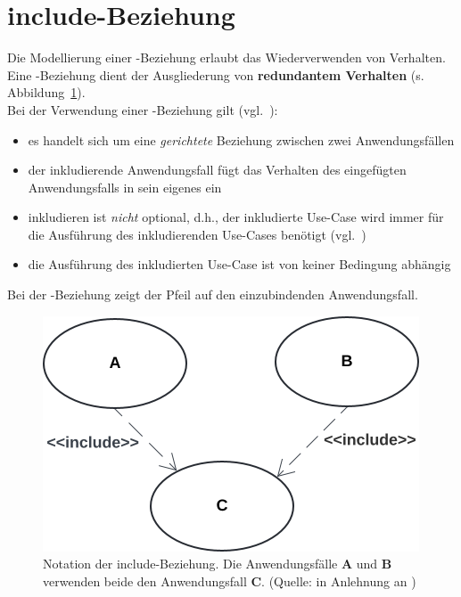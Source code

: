 \section{include-Beziehung}

\begin{tcolorbox}
    Die Modellierung einer -Beziehung erlaubt das Wiederverwenden von Verhalten.\\

    \noindent
    Eine -Beziehung dient der Ausgliederung von \textbf{redundantem Verhalten} (s.
    Abbildung~\ref{fig:usecase-include-cc}).\\

    \noindent
    Bei der Verwendung einer -Beziehung gilt (vgl.~\cite[53]{Buh09}):


    \begin{itemize}
        \item es handelt sich um eine \textit{gerichtete} Beziehung zwischen zwei Anwendungsfällen
        \item der inkludierende Anwendungsfall fügt das Verhalten des eingefügten Anwendungsfalls in sein eigenes ein
        \item inkludieren ist \textit{nicht} optional, d.h., der inkludierte Use-Case wird immer für die Ausführung des inkludierenden Use-Cases benötigt (vgl.~\cite[65 f.]{Bal05})
        \item die Ausführung des inkludierten Use-Case ist von keiner Bedingung abhängig
    \end{itemize}

    \noindent
    Bei der -Beziehung zeigt der Pfeil auf den einzubindenden Anwendungsfall.
\end{tcolorbox}



\begin{figure}
    \centering
    \includegraphics[scale=0.4]{part three/Anwendungsfalldiagramm/img/usecase-include}
    \caption{Notation der include-Beziehung. Die Anwendungsfälle \textbf{A} und \textbf{B} verwenden beide den Anwendungsfall \textbf{C}. (Quelle: in Anlehnung an \cite[66, Abb. 2.8-5]{Bal05})}
    \label{fig:usecase-include-cc}
\end{figure}


